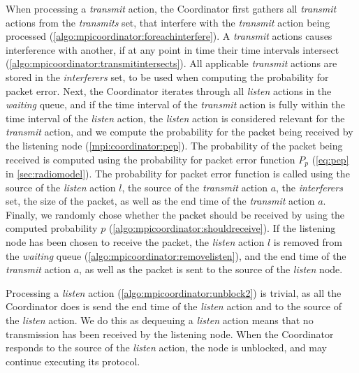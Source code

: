 When processing a \textit{transmit} action, the Coordinator first gathers all \textit{transmit} actions from
the \textit{transmits} set, that interfere with the \textit{transmit} action being processed
(\autoref{algo:mpicoordinator:foreachinterfere}). A \textit{transmit} actions causes interference with
another, if at any point in time their time intervals intersect
(\autoref{algo:mpicoordinator:transmitintersects}). All applicable \textit{transmit} actions are stored in the
\textit{interferers} set, to be used when computing the probability for packet error. Next, the Coordinator
iterates through all \textit{listen} actions in the \textit{waiting} queue, and if the time interval of the
\textit{transmit} action is fully within the time interval of the \textit{listen} action, the \textit{listen}
action is considered relevant for the \textit{transmit} action, and we compute the probability for the packet
being received by the listening node (\autoref{mpi:coordinator:pep}). The probability of the packet being
received is computed using the probability for packet error function $P_p$ (\autoref{eq:pep} in
\autoref{sec:radiomodel}). The probability for packet error function is called using the source of the
\textit{listen} action $l$, the source of the \textit{transmit} action $a$, the \textit{interferers} set, the
size of the packet, as well as the end time of the \textit{transmit} action $a$. Finally, we randomly chose
whether the packet should be received by using the computed probability $p$
(\autoref{algo:mpicoordinator:shouldreceive}). If the listening node has been chosen to receive the packet,
the \textit{listen} action $l$ is removed from the \textit{waiting} queue
(\autoref{algo:mpicoordinator:removelisten}), and the end time of the \textit{transmit} action $a$, as well as
the packet is sent to the source of the \textit{listen} node. \smallbreak

Processing a \textit{listen} action (\autoref{algo:mpicoordinator:unblock2}) is trivial, as all the
Coordinator does is send the end time of the \textit{listen} action and \KwNull to the source of the
\textit{listen} action. We do this as dequeuing a \textit{listen} action means that no transmission has been
received by the listening node. When the Coordinator responds to the source of the \textit{listen} action,
the node is unblocked, and may continue executing its protocol.